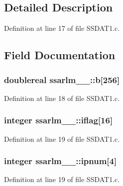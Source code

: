 \subsection{Detailed Description}


Definition at line 17 of file S\+S\+D\+A\+T1.\+c.



\subsection{Field Documentation}
\subsubsection[{\texorpdfstring{b}{b}}]{\setlength{\rightskip}{0pt plus 5cm}doublereal ssarlm\+\_\+\_\+\+::b\mbox{[}256\mbox{]}}\hypertarget{structssarlm__1___a2d1c77d268970034fa768539a0c9c370}{}\label{structssarlm__1___a2d1c77d268970034fa768539a0c9c370}


Definition at line 18 of file S\+S\+D\+A\+T1.\+c.

\subsubsection[{\texorpdfstring{iflag}{iflag}}]{\setlength{\rightskip}{0pt plus 5cm}integer ssarlm\+\_\+\_\+\+::iflag\mbox{[}16\mbox{]}}\hypertarget{structssarlm__1___accbbfa60e94bfa97aca4031ff38dc941}{}\label{structssarlm__1___accbbfa60e94bfa97aca4031ff38dc941}


Definition at line 19 of file S\+S\+D\+A\+T1.\+c.

\subsubsection[{\texorpdfstring{ipnum}{ipnum}}]{\setlength{\rightskip}{0pt plus 5cm}integer ssarlm\+\_\+\_\+\+::ipnum\mbox{[}4\mbox{]}}\hypertarget{structssarlm__1___aea84159ad2e7948b955742d829a4cf70}{}\label{structssarlm__1___aea84159ad2e7948b955742d829a4cf70}


Definition at line 19 of file S\+S\+D\+A\+T1.\+c.

